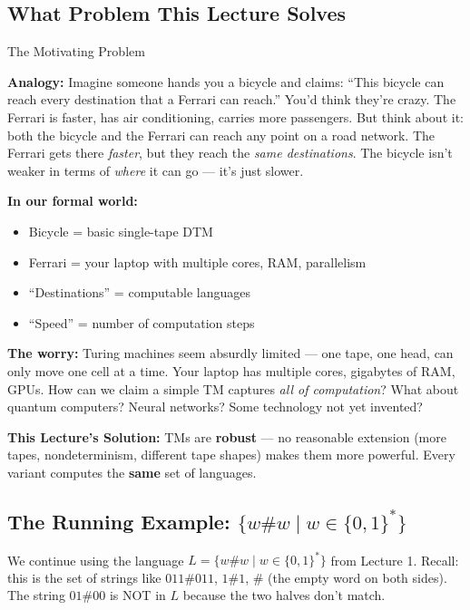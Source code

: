 \documentclass[11pt,a4paper]{article}
\begin{document}
\subsection{What Problem This Lecture Solves}

\begin{conceptbox}{The Motivating Problem}

\textbf{Analogy:} Imagine someone hands you a bicycle and claims: ``This bicycle can reach every destination that a Ferrari can reach.'' You'd think they're crazy. The Ferrari is faster, has air conditioning, carries more passengers. But think about it: both the bicycle and the Ferrari can reach any point on a road network. The Ferrari gets there \textit{faster}, but they reach the \textit{same destinations}. The bicycle isn't weaker in terms of \textit{where} it can go --- it's just slower.

\textbf{In our formal world:}
\begin{itemize}[nosep]
\item Bicycle = basic single-tape DTM
\item Ferrari = your laptop with multiple cores, RAM, parallelism
\item ``Destinations'' = computable languages
\item ``Speed'' = number of computation steps
\end{itemize}

\textbf{The worry:} Turing machines seem absurdly limited --- one tape, one head, can only move one cell at a time. Your laptop has multiple cores, gigabytes of RAM, GPUs. How can we claim a simple TM captures \textit{all of computation}? What about quantum computers? Neural networks? Some technology not yet invented?

\textbf{This Lecture's Solution:} TMs are \textbf{robust} --- no reasonable extension (more tapes, nondeterminism, different tape shapes) makes them more powerful. Every variant computes the \textbf{same} set of languages.
\end{conceptbox}

\subsection{The Running Example: $\{w\#w \mid w \in \{0,1\}^*\}$}

We continue using the language $L = \{w\#w \mid w \in \{0,1\}^*\}$ from Lecture 1. Recall: this is the set of strings like $011\#011$, $1\#1$, $\#$ (the empty word on both sides). The string $01\#00$ is NOT in $L$ because the two halves don't match.
\end{document}
